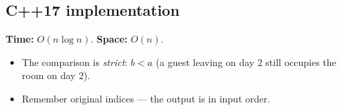 \subsection*{C++17 implementation}

\begin{complexitybox}
\textbf{Time:} $O(n\log n)$. \textbf{Space:} $O(n)$.
\end{complexitybox}

\begin{pitfallbox}
\begin{itemize}
  \item The comparison is \emph{strict}: $b<a$ (a guest leaving on day $2$
        still occupies the room on day $2$).
  \item Remember original indices --- the output is in input order.
\end{itemize}
\end{pitfallbox}
